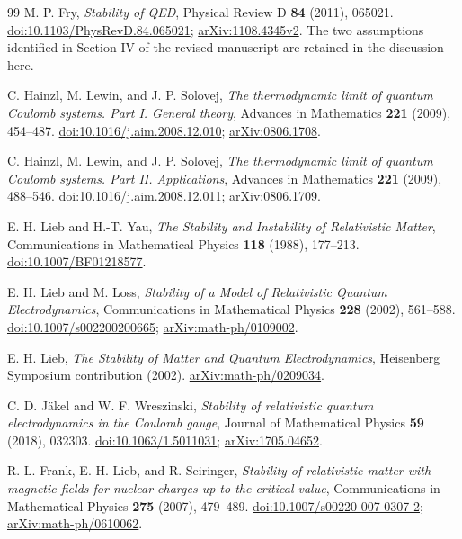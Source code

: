 \begin{thebibliography}{99}
M. P. Fry, \emph{Stability of QED},
Physical Review D \textbf{84} (2011), 065021.
\href{https://doi.org/10.1103/PhysRevD.84.065021}{doi:10.1103/PhysRevD.84.065021};
\href{https://arxiv.org/abs/1108.4345v2}{arXiv:1108.4345v2}.
The two assumptions identified in Section IV of the revised manuscript
are retained in the discussion here.

C. Hainzl, M. Lewin, and J. P. Solovej,
\emph{The thermodynamic limit of quantum Coulomb systems. Part I.
General theory},
Advances in Mathematics \textbf{221} (2009), 454--487.
\href{https://doi.org/10.1016/j.aim.2008.12.010}{doi:10.1016/j.aim.2008.12.010};
\href{https://arxiv.org/abs/0806.1708}{arXiv:0806.1708}.

C. Hainzl, M. Lewin, and J. P. Solovej,
\emph{The thermodynamic limit of quantum Coulomb systems. Part II.
Applications},
Advances in Mathematics \textbf{221} (2009), 488--546.
\href{https://doi.org/10.1016/j.aim.2008.12.011}{doi:10.1016/j.aim.2008.12.011};
\href{https://arxiv.org/abs/0806.1709}{arXiv:0806.1709}.

E. H. Lieb and H.-T. Yau,
\emph{The Stability and Instability of Relativistic Matter},
Communications in Mathematical Physics \textbf{118} (1988), 177--213.
\href{https://doi.org/10.1007/BF01218577}{doi:10.1007/BF01218577}.

E. H. Lieb and M. Loss,
\emph{Stability of a Model of Relativistic Quantum Electrodynamics},
Communications in Mathematical Physics \textbf{228} (2002), 561--588.
\href{https://doi.org/10.1007/s002200200665}{doi:10.1007/s002200200665};
\href{https://arxiv.org/abs/math-ph/0109002}{arXiv:math-ph/0109002}.

E. H. Lieb, \emph{The Stability of Matter and Quantum Electrodynamics},
Heisenberg Symposium contribution (2002).
\href{https://arxiv.org/abs/math-ph/0209034}{arXiv:math-ph/0209034}.

C. D. J\"akel and W. F. Wreszinski,
\emph{Stability of relativistic quantum electrodynamics in the Coulomb gauge},
Journal of Mathematical Physics \textbf{59} (2018), 032303.
\href{https://doi.org/10.1063/1.5011031}{doi:10.1063/1.5011031};
\href{https://arxiv.org/abs/1705.04652}{arXiv:1705.04652}.

R. L. Frank, E. H. Lieb, and R. Seiringer,
\emph{Stability of relativistic matter with magnetic fields for nuclear
charges up to the critical value},
Communications in Mathematical Physics \textbf{275} (2007), 479--489.
\href{https://doi.org/10.1007/s00220-007-0307-2}{doi:10.1007/s00220-007-0307-2};
\href{https://arxiv.org/abs/math-ph/0610062}{arXiv:math-ph/0610062}.
\end{thebibliography}
